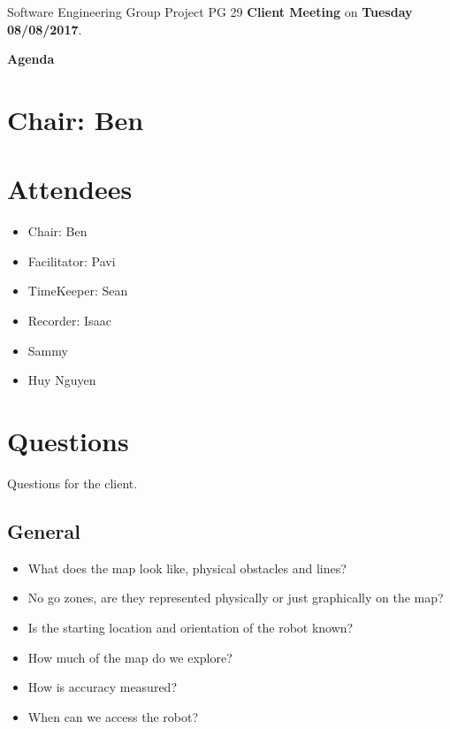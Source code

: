 \documentclass[11pt, a4paper]{article}
\begin{document}
\noindent Software Engineering Group Project PG 29 {\bf Client Meeting} on {\bf Tuesday 08/08/2017}.
\vspace*{10pt}
\begin{center}
\huge \bf Agenda
\end{center}

\section*{Chair: Ben}

\vspace*{10pt}

\section{Attendees}
\begin{itemize}
\item Chair: Ben
\item Facilitator: Pavi
\item TimeKeeper: Sean
\item Recorder: Isaac
\item Sammy
\item Huy Nguyen
\end{itemize}

\section{Questions}
Questions for the client.

\subsection{General}
\begin{itemize}
\item What does the map look like, physical obstacles and lines?
\item No go zones, are they represented physically or just graphically on the map?
\item Is the starting location and orientation of the robot known?
\item How much of the map do we explore?
\item How is accuracy measured?
\item When can we access the robot?
\end{itemize}
\end{document}
